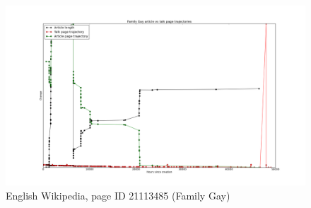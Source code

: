 \begin{figure}
  \centering
  \includegraphics[width=\linewidth]{img/specialcombo/en21113485.png}
  \caption{English Wikipedia, page ID 21113485 (Family Gay)}
\end{figure}
